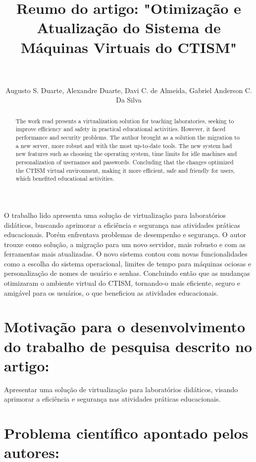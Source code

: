 \documentclass[12pt]{article}
\title{Reumo do artigo: "Otimização e Atualização do Sistema de Máquinas Virtuais do CTISM"\\\\ }
\author{Augusto S. Duarte\inst{1}, Alexandre Duarte\inst{2}, Davi C. de Almeida\inst{3}, Gabriel Anderson C. \\Da Silva\inst{4} }
\begin{document}
 

\maketitle

\begin{abstract}
The work read presents a virtualization solution for teaching laboratories, seeking to improve efficiency and safety in practical educational activities. However, it faced performance and security problems. The author brought as a solution the migration to a new server, more robust and with the most up-to-date tools. The new system had new features such as choosing the operating system, time limits for idle machines and personalization of usernames and passwords. Concluding that the changes optimized the CTISM virtual environment, making it more efficient, safe and friendly for users, which benefited educational activities.
\end{abstract}
     
\begin{resumo} 
O trabalho lido apresenta uma solução de virtualização para laboratórios didáticos, buscando aprimorar a eficiência e segurança nas atividades práticas educacionais. Porém enfrentava problemas de desempenho e segurança. O autor trouxe como solução, a migração para um novo servidor, mais robusto e com as ferramentas mais atualizadas. O novo sistema contou com novas funcionalidades como a escolha do sistema operacional, limites de tempo para máquinas ociosas e personalização de nomes de usuário e senhas. Concluindo então que as mudanças otimizaram o ambiente virtual do CTISM, tornando-o mais eficiente, seguro e amigável para os usuários, o que beneficiou as atividades educacionais.
\end{resumo}

\pagebreak
\section{Motivação para o desenvolvimento do trabalho de pesquisa descrito no artigo:}

Apresentar uma solução de virtualização para laboratórios didáticos, visando aprimorar a eficiência e segurança nas atividades práticas educacionais.

\section{Problema científico apontado pelos autores:} \label{sec:firstpage}
\end{document}
